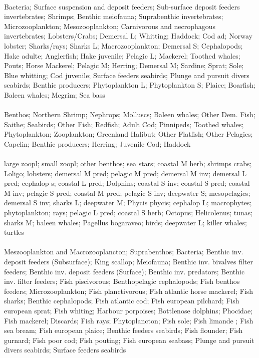 \fullhline
\hline
{} \\
\hline
Bacteria; Surface suspension and deposit feeders; Sub-surface deposit feeders invertebrates; Shrimps; Benthic meiofauna; Suprabenthic invertebrates; Microzooplankton; Mesozooplankton; Carnivorous and necrophagous invertebrates; Lobsters/Crabs; Demersal L; Whitting; Haddock; Cod ad; Norway lobster; Sharks/rays; Sharks L; Macrozooplankton; Demersal S; Cephalopods; Hake adulte; Anglerfish; Hake juvenile; Pelagic L; Mackerel; Toothed whales; Pouts; Horse Mackerel; Pelagic M; Herring; Demersal M; Sardine; Sprat; Sole; Blue whitting; Cod juvenile; Surface feeders seabirds; Plunge and pursuit divers seabirds; Benthic producers; Phytoplankton L; Phytoplankton S; Plaice; Boarfish; Baleen whales; Megrim; Sea bass\\
\fullhline
\hline
{} \\
\hline
Benthos; Northern Shrimp; Nephrops; Molluscs; Baleen whales; Other Dem. Fish; Saithe; Seabirds; Other Fish; Redfish; Adult Cod; Pinnipeds; Toothed whales; Phytoplankton; Zooplankton; Greenland Halibut; Other Flatfish; Other Pelagics; Capelin; Benthic producers; Herring; Juvenile Cod; Haddock\\
\fullhline
\hline
{} \\
\hline
large zoopl; small zoopl; other benthos; sea stars; coastal M herb; shrimps crabs; Loligo; lobsters; demersal M pred; pelagic M pred; demersal M inv; demersal L pred; cephalop s; coastal L pred; Dolphins; coastal S inv; coastal S pred; coastal M inv; pelagic S pred; coastal M pred; pelagic S inv; deepwater S; mesopelagics; demersal S inv; sharks L; deepwater M; Phycis phycis; cephalop L; macrophytes; phytoplankton; rays; pelagic L pred; coastal S herb; Octopus; Helicolenus; tunas; sharks M; baleen whales; Pagellus bogaraveo; birds; deepwater L; killer whales; turtles\\
\fullhline
\hline
{} \\
\hline
Meszooplankton and Macrozooplancton; Suprabenthos; Bacteria; Benthic inv. deposit feeders (Subsurface); King scallop; Meiofauna; Benthic inv. bivalves filter feeders; Benthic inv. deposit feeders (Surface); Benthic inv. predators; Benthic inv. filter feeders; Fish piscivorous; Benthopelagic cephalopods; Fish benthos feeders; Microzooplankton; Fish planctivorous; Fish atlantic horse mackerel; Fish sharks; Benthic cephalopods; Fish atlantic cod; Fish european pilchard; Fish european sprat; Fish whiting; Harbour porpoises; Bottlenose dolphins; Phocidae; Fish mackerel; Discards; Fish rays; Phytoplancton; Fish sole; Fish limande ; Fish sea bream; Fish european plaice; Benthic feeders seabirds; Fish flounder; Fish gurnard; Fish poor cod; Fish pouting; Fish european seabass; Plunge and pursuit divers seabirds; Surface feeders seabirds\\

